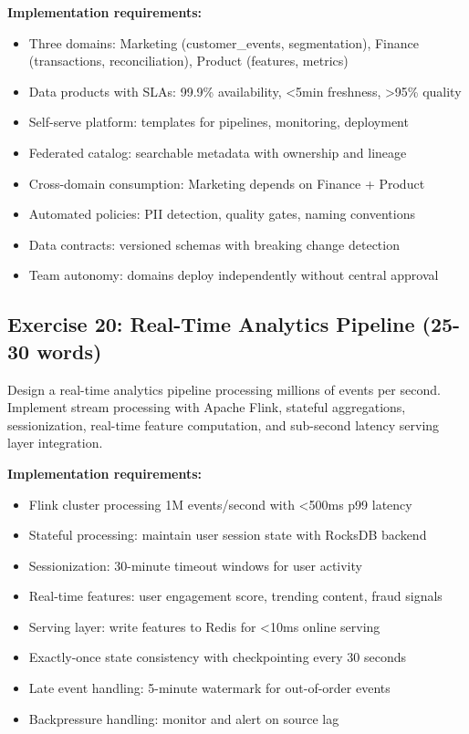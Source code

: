 \textbf{Implementation requirements:}
\begin{itemize}
    \item Three domains: Marketing (customer\_events, segmentation), Finance (transactions, reconciliation), Product (features, metrics)
    \item Data products with SLAs: 99.9\% availability, <5min freshness, >95\% quality
    \item Self-serve platform: templates for pipelines, monitoring, deployment
    \item Federated catalog: searchable metadata with ownership and lineage
    \item Cross-domain consumption: Marketing depends on Finance + Product
    \item Automated policies: PII detection, quality gates, naming conventions
    \item Data contracts: versioned schemas with breaking change detection
    \item Team autonomy: domains deploy independently without central approval
\end{itemize}

\subsection{Exercise 20: Real-Time Analytics Pipeline (25-30 words)}

Design a real-time analytics pipeline processing millions of events per second. Implement stream processing with Apache Flink, stateful aggregations, sessionization, real-time feature computation, and sub-second latency serving layer integration.

\textbf{Implementation requirements:}
\begin{itemize}
    \item Flink cluster processing 1M events/second with <500ms p99 latency
    \item Stateful processing: maintain user session state with RocksDB backend
    \item Sessionization: 30-minute timeout windows for user activity
    \item Real-time features: user engagement score, trending content, fraud signals
    \item Serving layer: write features to Redis for <10ms online serving
    \item Exactly-once state consistency with checkpointing every 30 seconds
    \item Late event handling: 5-minute watermark for out-of-order events
    \item Backpressure handling: monitor and alert on source lag
\end{itemize}

